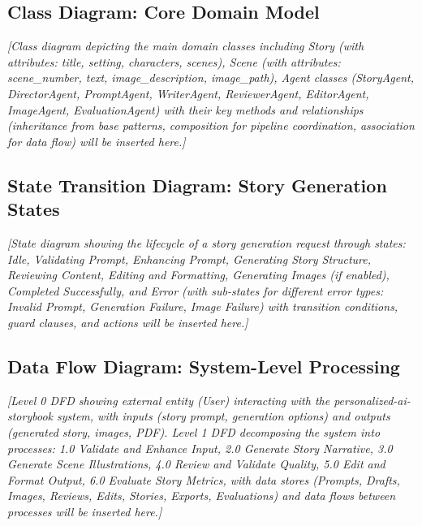 \subsection{Class Diagram: Core Domain Model}

\vspace{3cm}
\begin{center}
\textit{[Class diagram depicting the main domain classes including Story (with attributes: title, setting, characters, scenes), Scene (with attributes: scene\_number, text, image\_description, image\_path), Agent classes (StoryAgent, DirectorAgent, PromptAgent, WriterAgent, ReviewerAgent, EditorAgent, ImageAgent, EvaluationAgent) with their key methods and relationships (inheritance from base patterns, composition for pipeline coordination, association for data flow) will be inserted here.]}
\end{center}
\vspace{2cm}

\subsection{State Transition Diagram: Story Generation States}

\vspace{3cm}
\begin{center}
\textit{[State diagram showing the lifecycle of a story generation request through states: Idle, Validating Prompt, Enhancing Prompt, Generating Story Structure, Reviewing Content, Editing and Formatting, Generating Images (if enabled), Completed Successfully, and Error (with sub-states for different error types: Invalid Prompt, Generation Failure, Image Failure) with transition conditions, guard clauses, and actions will be inserted here.]}
\end{center}
\vspace{2cm}

\subsection{Data Flow Diagram: System-Level Processing}

\vspace{3cm}
\begin{center}
\textit{[Level 0 DFD showing external entity (User) interacting with the personalized-ai-storybook system, with inputs (story prompt, generation options) and outputs (generated story, images, PDF). Level 1 DFD decomposing the system into processes: 1.0 Validate and Enhance Input, 2.0 Generate Story Narrative, 3.0 Generate Scene Illustrations, 4.0 Review and Validate Quality, 5.0 Edit and Format Output, 6.0 Evaluate Story Metrics, with data stores (Prompts, Drafts, Images, Reviews, Edits, Stories, Exports, Evaluations) and data flows between processes will be inserted here.]}
\end{center}
\vspace{2cm}

